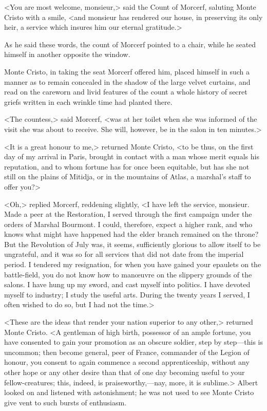  <You are most welcome, monsieur,> said the Count of Morcerf, saluting Monte Cristo with a smile, <and monsieur has rendered our house, in preserving its only heir, a service which insures him our eternal gratitude.> 

 As he said these words, the count of Morcerf pointed to a chair, while he seated himself in another opposite the window. 

 Monte Cristo, in taking the seat Morcerf offered him, placed himself in such a manner as to remain concealed in the shadow of the large velvet curtains, and read on the careworn and livid features of the count a whole history of secret griefs written in each wrinkle time had planted there. 

 <The countess,> said Morcerf, <was at her toilet when she was informed of the visit she was about to receive. She will, however, be in the salon in ten minutes.> 

 <It is a great honour to me,> returned Monte Cristo, <to be thus, on the first day of my arrival in Paris, brought in contact with a man whose merit equals his reputation, and to whom fortune has for once been equitable, but has she not still on the plains of Mitidja, or in the mountains of Atlas, a marshal's staff to offer you?> 

 <Oh,> replied Morcerf, reddening slightly, <I have left the service, monsieur. Made a peer at the Restoration, I served through the first campaign under the orders of Marshal Bourmont. I could, therefore, expect a higher rank, and who knows what might have happened had the elder branch remained on the throne? But the Revolution of July was, it seems, sufficiently glorious to allow itself to be ungrateful, and it was so for all services that did not date from the imperial period. I tendered my resignation, for when you have gained your epaulets on the battle-field, you do not know how to manœuvre on the slippery grounds of the salons. I have hung up my sword, and cast myself into politics. I have devoted myself to industry; I study the useful arts. During the twenty years I served, I often wished to do so, but I had not the time.> 

 <These are the ideas that render your nation superior to any other,> returned Monte Cristo. <A gentleman of high birth, possessor of an ample fortune, you have consented to gain your promotion as an obscure soldier, step by step—this is uncommon; then become general, peer of France, commander of the Legion of honour, you consent to again commence a second apprenticeship, without any other hope or any other desire than that of one day becoming useful to your fellow-creatures; this, indeed, is praiseworthy,—nay, more, it is sublime.>  Albert looked on and listened with astonishment; he was not used to see Monte Cristo give vent to such bursts of enthusiasm. 

